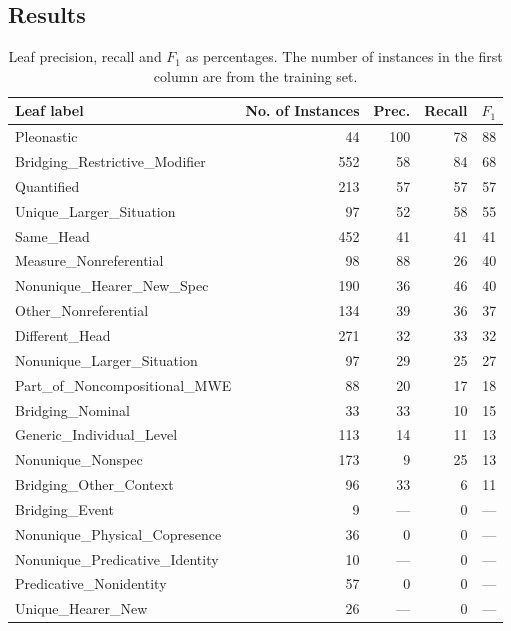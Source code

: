 \documentclass[11pt,letterpaper]{article}
\begin{document}
\subsection{Results}

\begin{table*}\small\centering
   \begin{tabular}{lr<{\hspace{23pt}}r<{\hspace{3pt}}r<{\hspace{5pt}}r}
      \textbf{Leaf label} & \multicolumn{1}{c}{\textbf{No. of Instances}} & \multicolumn{1}{c}{\textbf{Prec.}} & \multicolumn{1}{c}{\textbf{Recall}} & \textbf{$F_1$} \\
      \midrule
Pleonastic & 44 & 100 & 78 & 88 \\
Bridging\_Restrictive\_Modifier & 552 & 58 & 84 & 68 \\
Quantified & 213 & 57 & 57 & 57 \\
Unique\_Larger\_Situation & 97 & 52 & 58 & 55 \\
Same\_Head & 452 & 41 & 41 & 41 \\
Measure\_Nonreferential & 98 & 88 & 26 & 40 \\
Nonunique\_Hearer\_New\_Spec & 190 & 36 & 46 & 40 \\
Other\_Nonreferential & 134 & 39 & 36 & 37 \\
Different\_Head & 271 & 32 & 33 & 32 \\
Nonunique\_Larger\_Situation & 97 & 29 & 25 & 27 \\
Part\_of\_Noncompositional\_MWE & 88 & 20 & 17 & 18 \\
Bridging\_Nominal & 33 & 33 & 10 & 15 \\
Generic\_Individual\_Level & 113 & 14 & 11 & 13 \\
Nonunique\_Nonspec & 173 & 9 & 25 & 13 \\
Bridging\_Other\_Context & 96 & 33 & 6 & 11 \\
Bridging\_Event & 9 & --- & 0 & --- \\
Nonunique\_Physical\_Copresence & 36 & 0 & 0 & --- \\
Nonunique\_Predicative\_Identity & 10 & --- & 0 & --- \\
Predicative\_Nonidentity & 57 & 0 & 0 & --- \\
Unique\_Hearer\_New & 26 & --- & 0 & --- \\
   \end{tabular}
   \caption{Leaf precision, recall and $F_1$ as percentages. 
The number of instances in the first column are from the training set.}
   \label{tbl:leaf}
\end{table*}
\end{document}
